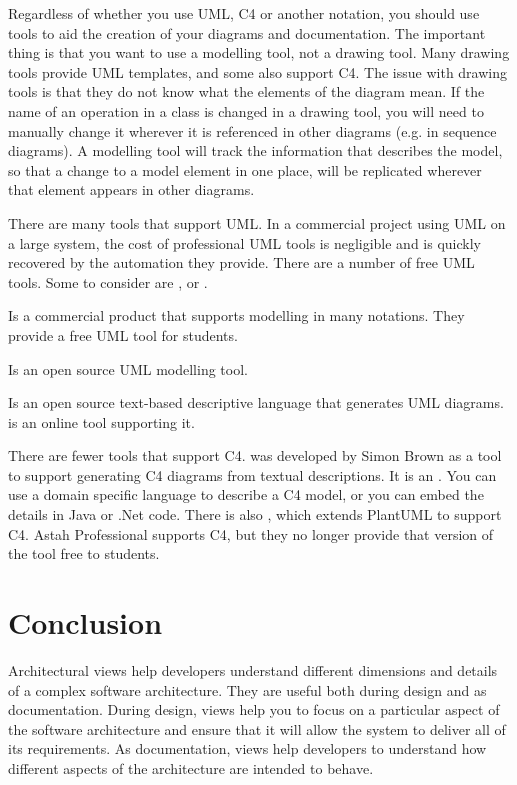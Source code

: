 Regardless of whether you use UML, C4 or another notation, you should use tools to aid the creation of your diagrams and documentation.
The important thing is that you want to use a modelling tool, not a drawing tool.
Many drawing tools provide UML templates, and some also support C4.
The issue with drawing tools is that they do not know what the elements of the diagram mean.
If the name of an operation in a class is changed in a drawing tool, you will need to manually change it wherever it is referenced in other diagrams
(e.g. in sequence diagrams).
A modelling tool will track the information that describes the model, so that a change to a model element in one place,
will be replicated wherever that element appears in other diagrams.

There are many tools that support UML.
In a commercial project using UML on a large system, the cost of professional UML tools is negligible and is quickly recovered by the automation they provide.
There are a number of free UML tools. Some to consider are ,
 or .
 \begin{description}[nosep]
    \item[Astah] Is a commercial product that supports modelling in many notations. They provide a free UML tool for students.
    \item[ModelIO] Is an open source UML modelling tool.
    \item[PlantUML] Is an open source text-based descriptive language that generates UML diagrams.
                               is an online tool supporting it.
\end{description}

\noindent
There are fewer tools that support C4.
 was developed by Simon Brown as a tool to support generating C4 diagrams from textual descriptions.
It is an .
You can use a domain specific language to describe a C4 model, or you can embed the details in Java or .Net code.
There is also , which extends PlantUML to support C4.
Astah Professional supports C4, but they no longer provide that version of the tool free to students.

\section{Conclusion}
Architectural views help developers understand different dimensions and details of a complex software architecture.
They are useful both during design and as documentation.
During design, views help you to focus on a particular aspect of the software architecture and ensure that it will allow the system to deliver all of its requirements.
As documentation, views help developers to understand how different aspects of the architecture are intended to behave.

